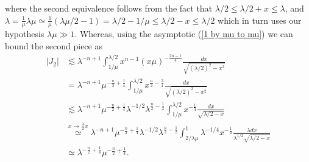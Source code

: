 \documentclass[11pt, reqno]{amsart}
\theoremstyle{plain}
\theoremstyle{remark}
\theoremstyle{example}
\theoremstyle{definition}
\numberwithin{equation}{section}
\begin{document}
where the second equivalence follows from the fact that $\lambda/2 \leq \lambda/2 + x \leq \lambda$, and $\lambda = \frac{1}{\mu} \lambda \mu \simeq \frac{1}{\mu} (\lambda \mu /2 -1) = \lambda/2 - 1 / \mu \leq \lambda /2 - x \leq \lambda /2$ which in turn uses our hypothesis $\lambda \mu \gg 1$. Whereas, using the asymptotic (\ref{1 by mu to mu}) we can bound the second piece as
\begin{equation} \label{J2 estimate}
   \begin{split}
         |J_{2}|
        & \lesssim \lambda^{-n +1}   \int_{ 1 / \mu}^{\lambda/2}      x^{n-1} (x \mu )^{-\frac{2n-1}{4}} \frac{dx}{\sqrt{(\lambda/2)^2 -  x^2}}\\
         & = \lambda^{-n +1} \mu^{- \frac{n}{2} + \frac{1}{4}}   \int_{ 1 / \mu}^{\lambda/2}      x^{\frac{n}{2} - \frac{3}{4}} \frac{dx}{\sqrt{(\lambda/2)^2 -  x^2}}\\
         & \lesssim \lambda^{-n +1} \mu^{- \frac{n}{2} + \frac{1}{4}} \lambda^{-1/2} \lambda^{ \frac{n}{2} - \frac{1}{2}}  \int_{ 1 / \mu}^{\lambda/2}      x^{- \frac{1}{4}} \frac{dx}{\sqrt{\lambda/2 -  x}}\\
         & \overset{ x \rightarrow \frac{\lambda}{2} x }{ \simeq } \lambda^{-n +1} \mu^{- \frac{n}{2} + \frac{1}{4}} \lambda^{-1/2} \lambda^{ \frac{n}{2} - \frac{1}{2}}  \int_{ 2 / \lambda \mu}^{1}   \lambda^{-1/4}   x^{- \frac{1}{4}} \frac{ \lambda dx}{\lambda^{1/2} \sqrt{\lambda/2 -  x}}\\
         & \simeq \lambda^{- \frac{n}{2} + \frac{1}{4}} \mu^{- \frac{n}{2} + \frac{1}{4}}.
   \end{split}
\end{equation}

\end{document}
